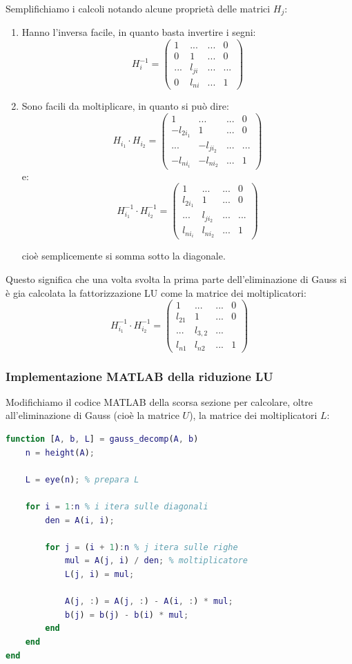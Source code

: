 \documentclass[a4paper,11pt]{article}
\begin{document}
Semplifichiamo i calcoli notando alcune proprietà delle matrici $H_j$:
\begin{enumerate}
	\item Hanno l'inversa facile, in quanto basta invertire i segni:
	$$
	H_i^{-1} = \begin{pmatrix}
		1 & ... & ... & 0 \\
		0 & 1 & ... & 0 \\
		... & l_{ji} & ... & ... \\
		0 & l_{ni} & ... & 1
	\end{pmatrix}
	$$

	\item Sono facili da moltiplicare, in quanto si può dire:
	$$
		H_{i_1} \cdot H_{i_2} = \begin{pmatrix}
		1 & ... & ... & 0 \\
		-l_{2i_1} & 1 & ... & 0 \\
		... & -l_{ji_2} & ... & ... \\
		-l_{ni_i} & -l_{ni_2} & ... & 1
	\end{pmatrix}
	$$
	e:	
	$$
	H_{i_1}^{-1} \cdot H_{i_2}^{-1} = \begin{pmatrix}
		1 & ... & ... & 0 \\
		l_{2i_1} & 1 & ... & 0 \\
		... & l_{ji_2} & ... & ... \\
		l_{ni_i} & l_{ni_2} & ... & 1
	\end{pmatrix}
	$$

	cioè semplicemente si somma sotto la diagonale.
\end{enumerate}

Questo significa che una volta svolta la prima parte dell'eliminazione di Gauss si è gia calcolata la fattorizzazione LU come la matrice dei moltiplicatori:
$$
H_{i_1}^{-1} \cdot H_{i_2}^{-1} = \begin{pmatrix}
	1 & ... & ... & 0 \\
	l_{21} & 1 & ... & 0 \\
	... & l_{3,2} & ...\\
	l_{n1} & l_{n2} & ... & 1
\end{pmatrix}
$$

\subsubsection{Implementazione MATLAB della riduzione LU}
Modifichiamo il codice MATLAB della scorsa sezione per calcolare, oltre all'eliminazione di Gauss (cioè la matrice $U$), la matrice dei moltiplicatori $L$:
\begin{lstlisting}[language=matlab, style=codestyle]	
function [A, b, L] = gauss_decomp(A, b)
    n = height(A);

    L = eye(n); % prepara L

    for i = 1:n % i itera sulle diagonali
        den = A(i, i);

        for j = (i + 1):n % j itera sulle righe
            mul = A(j, i) / den; % moltiplicatore
            L(j, i) = mul;
            
            A(j, :) = A(j, :) - A(i, :) * mul;
            b(j) = b(j) - b(i) * mul;
        end
    end
end
\end{lstlisting}
\end{document}
